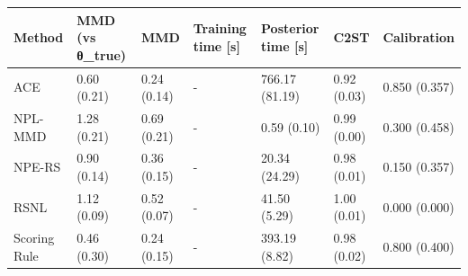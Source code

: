 \begin{tabular}{lllllll}
\toprule
Method & MMD (vs θ_true) & MMD & Training time [s] & Posterior time [s] & C2ST & Calibration \\
\midrule
ACE & 0.60 (0.21) & 0.24 (0.14) & - & 766.17 (81.19) & 0.92 (0.03) & 0.850 (0.357) \\
NPL-MMD & 1.28 (0.21) & 0.69 (0.21) & - & 0.59 (0.10) & 0.99 (0.00) & 0.300 (0.458) \\
NPE-RS & 0.90 (0.14) & 0.36 (0.15) & - & 20.34 (24.29) & 0.98 (0.01) & 0.150 (0.357) \\
RSNL & 1.12 (0.09) & 0.52 (0.07) & - & 41.50 (5.29) & 1.00 (0.01) & 0.000 (0.000) \\
Scoring Rule & 0.46 (0.30) & 0.24 (0.15) & - & 393.19 (8.82) & 0.98 (0.02) & 0.800 (0.400) \\
\bottomrule
\end{tabular}
